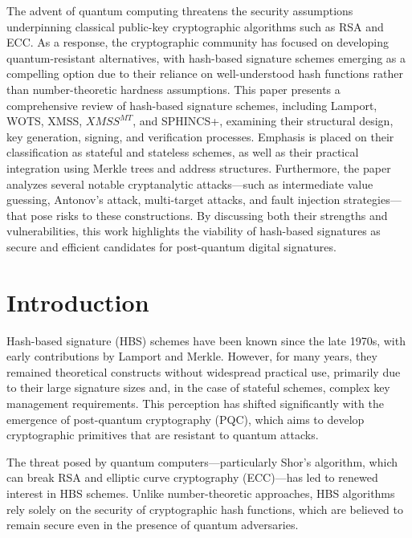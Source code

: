 \documentclass [version=submission]{iacrcc}
\begin{document}
\begin{textabstract}
  The advent of quantum computing threatens the security assumptions underpinning classical public-key cryptographic algorithms such as RSA and ECC. As a response, the cryptographic community has focused on developing quantum-resistant alternatives, with hash-based signature schemes emerging as a compelling option due to their reliance on well-understood hash functions rather than number-theoretic hardness assumptions. This paper presents a comprehensive review of hash-based signature schemes, including Lamport, WOTS, XMSS, $XMSS^{MT}$, and SPHINCS+, examining their structural design, key generation, signing, and verification processes. Emphasis is placed on their classification as stateful and stateless schemes, as well as their practical integration using Merkle trees and address structures. Furthermore, the paper analyzes several notable cryptanalytic attacks—such as intermediate value guessing, Antonov’s attack, multi-target attacks, and fault injection strategies—that pose risks to these constructions. By discussing both their strengths and vulnerabilities, this work highlights the viability of hash-based signatures as secure and efficient candidates for post-quantum digital signatures.
\end{textabstract}

\section{Introduction}
Hash-based signature (HBS) schemes have been known since the late 1970s, with early contributions by Lamport and Merkle. However, for many years, they remained theoretical constructs without widespread practical use, primarily due to their large signature sizes and, in the case of stateful schemes, complex key management requirements. This perception has shifted significantly with the emergence of post-quantum cryptography (PQC), which aims to develop cryptographic primitives that are resistant to quantum attacks.

The threat posed by quantum computers—particularly Shor's algorithm, which can break RSA and elliptic curve cryptography (ECC)—has led to renewed interest in HBS schemes. Unlike number-theoretic approaches, HBS algorithms rely solely on the security of cryptographic hash functions, which are believed to remain secure even in the presence of quantum adversaries.
\end{document}
